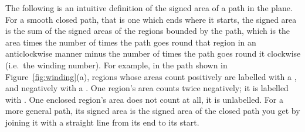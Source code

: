 The following is an intuitive definition of the signed area of a path in the plane. For a smooth closed path, that is one which ends where it starts, the signed area is the sum of the signed areas of the regions bounded by the path, which is the area times the number of times the path goes round that region in an anticlockwise manner minus the number of times the path goes round it clockwise (i.e.~the winding number). For example, in the path shown in Figure~\ref{fig:winding}(a), regions whose areas count positively are labelled with a \raisebox{1mm}{\tiny\boldmath\color{red}$+$}, and negatively with a \raisebox{1mm}{\tiny\boldmath\color{red}$-$}. One region's area counts twice negatively; it is labelled with \raisebox{1mm}{\tiny\boldmath\color{red}$--$}. One enclosed region's area does not count at all, it is unlabelled. For a more general path, its signed area is the signed area of the closed path you get by joining it with a straight line from its end to its start.
\def\windingpoints{(0,0) (1,1) (3,1) (1.5,-1) (1,-1) (0.8,0.7) (1.3,1.6)(1.1,1.7)(0.9,1.4)(1.8,0.5)(2.8,-1.3)(3.6,0.2)}
